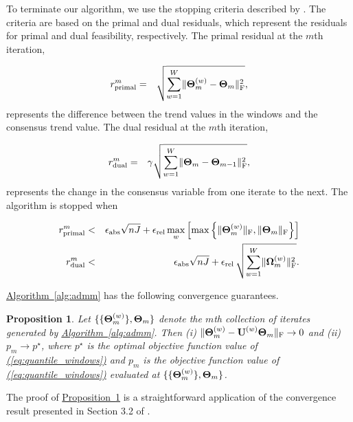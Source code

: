 \documentclass[aoas]{imsart}
\newtheorem{proposition}{Proposition}[section]
\newcommand{\Eqn}[1]{\hyperref[eq:#1]{{\rm (\ref*{eq:#1})}}} %
\newcommand{\Prop}[1]{\hyperref[prop:#1]{Proposition~\ref*{prop:#1}}} %
\newcommand{\Alg}[1]{\hyperref[alg:#1]{Algorithm~\ref*{alg:#1}}} %
\newcommand{\Eqn}[1]{{(\ref{eq:#1})}} %
\newcommand{\Prop}[1]{{Property~\ref{prop:#1}}} %
\newcommand{\Alg}[1]{{Algorithm~\ref{alg:#1}}} %
\newcommand{\M}[1]{{\bm{\mathbf{\MakeUppercase{#1}}}}} %
\newcommand{\Mn}[2]{\M{#1}^{(#2)}} %
\begin{document}
To terminate our algorithm, we use the stopping criteria described by \cite{boyd2011distributed}. The criteria are based on the primal and dual residuals, which represent the residuals for primal and dual feasibility, respectively. The primal residual at the $m$th iteration,

\begin{eqnarray*}
	r_{\text{primal}}^{m} & = & \sqrt{\sum_{w=1}^W\lVert\Mn{\Theta}{w}_{m} - \M{\Theta}_m\rVert_{\text{F}}^2},
\end{eqnarray*}
represents the difference between the trend values in the windows and the consensus trend value. The dual residual at the $m$th iteration,

\begin{eqnarray*}
	r_{\text{dual}}^{m} & = & \gamma\sqrt{\sum_{w=1}^W \lVert\M{\Theta}_m - \M{\Theta}_{m-1}\rVert_{\text{F}}^2},
\end{eqnarray*}
represents the change in the consensus variable from one iterate to the next. The algorithm is stopped when

\begin{eqnarray*}
	r_{\text{primal}}^{m} & < &\epsilon_{\text{abs}}\sqrt{nJ} + \epsilon_{\text{rel}}\,\underset{w}{\max} \left[\max
	\left\{\lVert\Mn{\Theta}{w}_m \rVert_{\text{F}}, \lVert \M{\Theta}_{m} \rVert_{\text{F}} \right\}\right] \\%
	r_{\text{dual}}^{m} & < & \epsilon_{\text{abs}}\sqrt{nJ} + \epsilon_{\text{rel}}\,\sqrt{\sum_{w=1}^W
		\lVert \Mn{\Omega}{w}_m \rVert_{\text{F}}^2}.
\end{eqnarray*}

\Alg{admm} has the following convergence guarantees.

\begin{proposition}
	\label{prop:convergence}
	Let $\{\{\Mn{\Theta}{w}_m\}, \M{\Theta}_m\}$ denote the $m$th collection of iterates generated by \Alg{admm}. Then (i)
	$\lVert \Mn{\Theta}{w}_m - \Mn{U}{w}\M{\Theta}_m \rVert_{\text{F}} \rightarrow 0$ and (ii) $p_m \rightarrow p^\star$, where $p^\star$ is the optimal objective function value of
	\Eqn{quantile_windows} and $p_m$ is the objective function value of \Eqn{quantile_windows} evaluated at $\{\{\Mn{\Theta}{w}_m\}, \M{\Theta}_m\}$.
\end{proposition}

The proof of \Prop{convergence} is a straightforward application of the convergence result presented in Section 3.2 of \cite{boyd2011distributed}.
\end{document}
